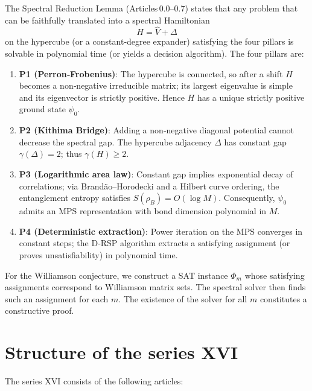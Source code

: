 \documentclass[11pt,a4paper]{article}
\begin{document}
The Spectral Reduction Lemma (Articles 0.0–0.7) states that any problem that can be faithfully translated into a spectral Hamiltonian
\[
H = \hat{V} + \Delta
\]
on the hypercube (or a constant‑degree expander) satisfying the four pillars is solvable in polynomial time (or yields a decision algorithm). The four pillars are:

\begin{enumerate}
\item \textbf{P1 (Perron‑Frobenius)}: The hypercube is connected, so after a shift $H$ becomes a non‑negative irreducible matrix; its largest eigenvalue is simple and its eigenvector is strictly positive. Hence $H$ has a unique strictly positive ground state $\psi_0$.
\item \textbf{P2 (Kithima Bridge)}: Adding a non‑negative diagonal potential cannot decrease the spectral gap. The hypercube adjacency $\Delta$ has constant gap $\gamma(\Delta)=2$; thus $\gamma(H) \ge 2$.
\item \textbf{P3 (Logarithmic area law)}: Constant gap implies exponential decay of correlations; via Brandão–Horodecki and a Hilbert curve ordering, the entanglement entropy satisfies $S(\rho_B)=O(\log M)$. Consequently, $\psi_0$ admits an MPS representation with bond dimension polynomial in $M$.
\item \textbf{P4 (Deterministic extraction)}: Power iteration on the MPS converges in constant steps; the D‑RSP algorithm extracts a satisfying assignment (or proves unsatisfiability) in polynomial time.
\end{enumerate}

For the Williamson conjecture, we construct a SAT instance $\Phi_m$ whose satisfying assignments correspond to Williamson matrix sets. The spectral solver then finds such an assignment for each $m$. The existence of the solver for all $m$ constitutes a constructive proof.

\section{Structure of the series XVI}

The series XVI consists of the following articles:
\end{document}

